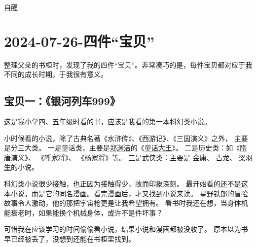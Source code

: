 \begin{taged}{自醒}
  \section{2024-07-26-四件“宝贝”}
\end{taged}

整理父亲的书柜时，发现了我的四件“宝贝”。非常凑巧的是，每件宝贝都对应于我不同的成长时期，于我很有意义。

\subsection{宝贝一：《银河列车999》}

这是我小学四、五年级时看的书，应该是我看的第一本科幻类小说。

小时候看的小说，除了古典名著《水浒传》、《西游记》、《三国演义》之外，
主要是分三大类。
一是童话类，主要是\href{https://baike.baidu.com/item/郑渊洁/171175}{郑渊洁}的《\href{https://baike.baidu.com/item/童话大王}{童话大王}》。
二是历史类：如《\href{https://baike.baidu.com/item/隋唐演义/17618}{隋唐演义}》、
《\href{https://baike.baidu.com/item/呼家将/9415693}{呼家将}》、
《\href{https://baike.baidu.com/item/杨家将/61878}{杨家将}》等。
三是武侠类：主要是
\href{https://baike.baidu.com/item/金庸/128951}{金庸}、
\href{https://baike.baidu.com/item/古龙/134560}{古龙}、
\href{https://baike.baidu.com/item/梁羽生/142326}{梁羽生}的小说。

科幻类小说很少接触，也正因为接触得少，故而印象深刻。
最开始看的还不是这本小说，而是它的同名漫画。看完漫画后，才又找到小说来读。
星野铁郎的冒险故事令人激动，他的那把宇宙枪更是让我希望拥有。
看书时我还在想，当身体机能衰老时，如果能换个机械身体，或许不是件坏事？

可惜我在应该学习的时间偷偷看小说，结果小说和漫画都被没收了。
原本以为书早已经被丢了，没想到还能在书柜里找到。

